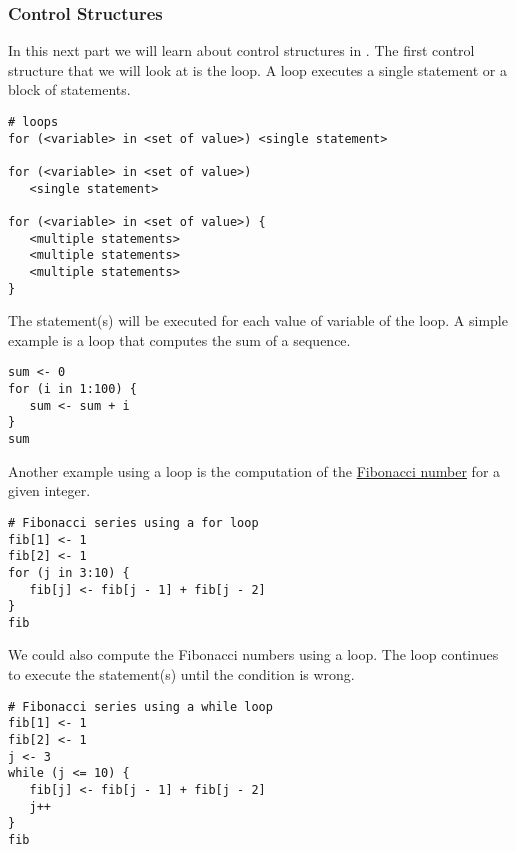 \subsubsection{Control Structures}
In this next part we will learn about control structures in \Rev. 
The first control structure that we will look at is the  loop.
A  loop executes a single statement or a block of statements.
{\tt \begin{snugshade*}
\begin{lstlisting}    
# loops
for (<variable> in <set of value>) <single statement>
 
for (<variable> in <set of value>) 
   <single statement>

for (<variable> in <set of value>) {
   <multiple statements>
   <multiple statements>
   <multiple statements>
}
\end{lstlisting}
\end{snugshade*}}
The statement(s) will be executed for each value of variable of the  loop.
A simple example is a  loop that computes the sum of a sequence.
{\tt \begin{snugshade*}
\begin{lstlisting}    
sum <- 0
for (i in 1:100) {
   sum <- sum + i
}
sum
\end{lstlisting}
\end{snugshade*}}
Another example using a  loop is the computation of the \href{http://en.wikipedia.org/wiki/Fibonacci_number}{Fibonacci number} for a given integer. 
{\tt \begin{snugshade*}
\begin{lstlisting}    
# Fibonacci series using a for loop
fib[1] <- 1
fib[2] <- 1
for (j in 3:10) {
   fib[j] <- fib[j - 1] + fib[j - 2]
}
fib
\end{lstlisting}
\end{snugshade*}}
We could also compute the Fibonacci numbers using a  loop.
The  loop continues to execute the statement(s) until the condition is wrong.
{\tt \begin{snugshade*}
\begin{lstlisting}    
# Fibonacci series using a while loop
fib[1] <- 1
fib[2] <- 1
j <- 3
while (j <= 10) {
   fib[j] <- fib[j - 1] + fib[j - 2]
   j++
}
fib
\end{lstlisting}
\end{snugshade*}}

